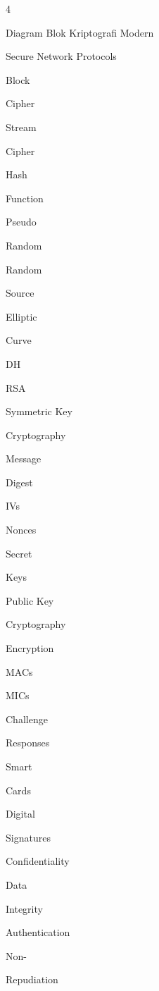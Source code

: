 \documentclass{article}
\begin{document}

4

Diagram Blok Kriptografi Modern

Secure Network Protocols

Block

Cipher

Stream

Cipher

Hash

Function

Pseudo

Random

Random

Source

Elliptic

Curve

DH

RSA

Symmetric Key

Cryptography

Message

Digest

IVs

Nonces

Secret

Keys

Public Key

Cryptography

Encryption

MACs

MICs

Challenge

Responses

Smart

Cards

Digital

Signatures

Confidentiality

Data

Integrity

Authentication

Non-

Repudiation
\end{document}
